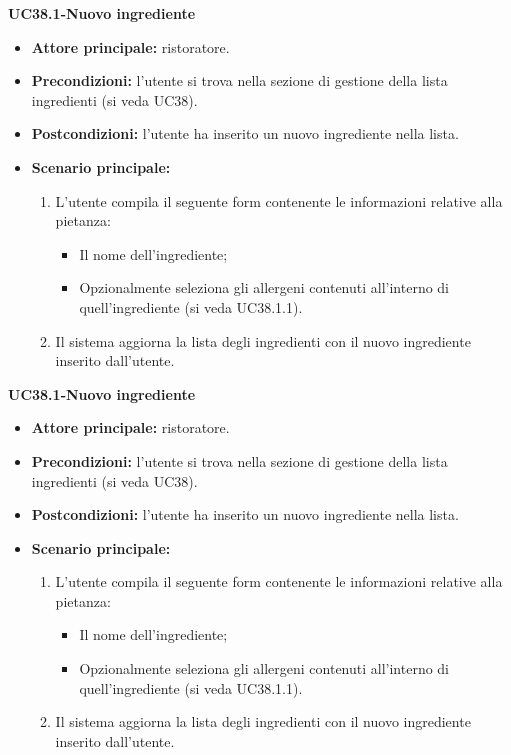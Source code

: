 \textbf{UC38.1-Nuovo ingrediente}  
\begin{itemize}
    \item \textbf{Attore principale:} ristoratore.
    \item \textbf{Precondizioni:} l'utente si trova nella sezione di gestione della lista ingredienti (si veda UC38).
    \item \textbf{Postcondizioni:} l'utente ha inserito un nuovo ingrediente nella lista.
    \item \textbf{Scenario principale:}
    \begin{enumerate}
        \item L'utente compila il seguente form contenente le informazioni relative alla pietanza:
        \begin{itemize}
            \item Il nome dell'ingrediente;
            \item Opzionalmente seleziona gli allergeni contenuti all'interno di quell'ingrediente (si veda UC38.1.1).
        \end{itemize}
        \item Il sistema aggiorna la lista degli ingredienti con il nuovo ingrediente inserito dall'utente.
    \end{enumerate}
\end{itemize}

\textbf{UC38.1-Nuovo ingrediente}  
\begin{itemize}
    \item \textbf{Attore principale:} ristoratore.
    \item \textbf{Precondizioni:} l'utente si trova nella sezione di gestione della lista ingredienti (si veda UC38).
    \item \textbf{Postcondizioni:} l'utente ha inserito un nuovo ingrediente nella lista.
    \item \textbf{Scenario principale:}
    \begin{enumerate}
        \item L'utente compila il seguente form contenente le informazioni relative alla pietanza:
        \begin{itemize}
            \item Il nome dell'ingrediente;
            \item Opzionalmente seleziona gli allergeni contenuti all'interno di quell'ingrediente (si veda UC38.1.1).
        \end{itemize}
        \item Il sistema aggiorna la lista degli ingredienti con il nuovo ingrediente inserito dall'utente.
    \end{enumerate}
\end{itemize}

